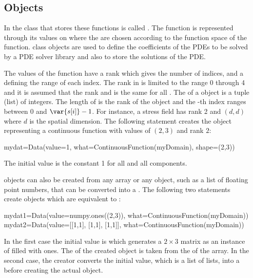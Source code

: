 \subsection{\Data Objects}
In \escript the class that stores these functions is called \Data.
The function is represented through its values on \DataSamplePoints where
the \DataSamplePoints are chosen according to the function space of the
function.
\Data class objects are used to define the coefficients of the PDEs to be
solved by a PDE solver library and also to store the solutions of the PDE.

The values of the function have a rank which gives the number of indices,
and a \Shape defining the range of each index.
The rank in \escript is limited to the range 0 through 4 and it is assumed
that the rank and \Shape is the same for all \DataSamplePoints.
The \Shape of a \Data object is a tuple (list)  of integers.
The length of  is the rank of the \Data object and the -th
index ranges between 0 and $\var{s[i]}-1$.
For instance, a stress field has rank 2 and \Shape $(d,d)$ where $d$ is the
spatial dimension.
The following statement creates the \Data object  representing a
continuous function with values of \Shape $(2,3)$ and rank $2$:
\begin{python}
  mydat=Data(value=1, what=ContinuousFunction(myDomain), shape=(2,3))
\end{python}
The initial value is the constant 1 for all \DataSamplePoints and all
components.

\Data objects can also be created from any \numpy array or any object, such
as a list of floating point numbers, that can be converted into
a \numpyNDA\cite{NUMPY}.
The following two statements create objects which are equivalent
to :
\begin{python}
  mydat1=Data(value=numpy.ones((2,3)), what=ContinuousFunction(myDomain))
  mydat2=Data(value=[[1,1], [1,1], [1,1]], what=ContinuousFunction(myDomain))
\end{python}
In the first case the initial value is  which generates
a $2 \times 3$ matrix as an instance of \numpyNDA filled with ones.
The \Shape of the created \Data object is taken from the \Shape of the array.
In the second case, the creator converts the initial value, which is a list of
lists, into a \numpyNDA before creating the actual \Data object.

